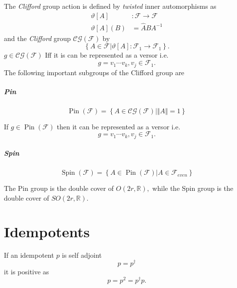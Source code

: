 \documentclass[aps,preprint]{revtex4}%
\begin{document}
The \emph{Clifford }group action is defined by \emph{twisted} inner
automorphisms as
\begin{align}
\vartheta\left[  A\right]   &  :\mathcal{F\longrightarrow F}\\
\vartheta\left[  A\right]  \left(  B\right)   &  =\widehat{A}BA^{-1}%
\end{align}
and the \emph{Clifford }group $\mathcal{CG}\left(  \mathcal{F}\right)  $ by
\begin{equation}
\left\{  \left.  A\in\mathcal{F}\right\vert \vartheta\left[  A\right]
:\mathcal{F}_{1}\mathcal{\longrightarrow F}_{1}\right\}  .
\end{equation}
$g\in\mathcal{CG}\left(  \mathcal{F}\right)  $ Iff it is can be represented as
a versor i.e.
\begin{equation}
g=v_{1}\cdots v_{k},v_{j}\in\mathcal{F}_{1}.
\end{equation}
The following important subgroups of the Clifford group are

\subparagraph{Pin}%

\begin{equation}
\operatorname*{Pin}\left(  \mathcal{F}\right)  =\left\{  \left.
A\in\mathcal{CG}\left(  \mathcal{F}\right)  \right\vert \left\Vert
A\right\Vert =1\right\}
\end{equation}


If $g\in\operatorname*{Pin}\left(  \mathcal{F}\right)  $ then it can be
represented as a versor i.e.
\begin{equation}
g=v_{1}\cdots v_{k},v_{j}\in\mathcal{F}_{1}.
\end{equation}


\subparagraph{Spin}%

\begin{equation}
\operatorname*{Spin}\left(  \mathcal{F}\right)  =\left\{  \left.
A\in\operatorname*{Pin}\left(  \mathcal{F}\right)  \right\vert A\in
\mathcal{F}_{even}\right\}
\end{equation}


The Pin group is the double cover of $O(2r,\mathbb{R}),$ while the Spin group
is the double cover of $SO(2r,\mathbb{R}).$

\section{Idempotents}

If an idempotent $p$ is self adjoint
\begin{equation}
p=p^{\dagger}%
\end{equation}
it is positive as
\begin{equation}
p=p^{2}=p^{\dagger}p.
\end{equation}
\end{document}
